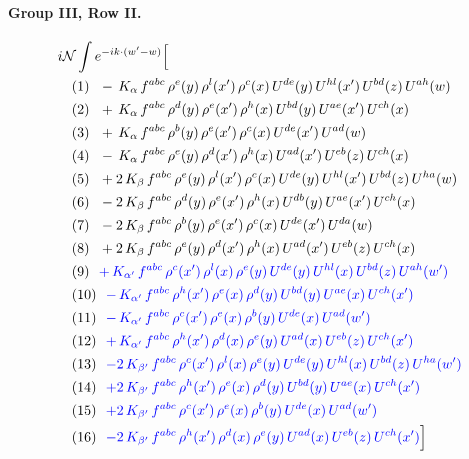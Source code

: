 \documentclass[10pt]{article}
\numberwithin{equation}{section}
\newcommand{\NN}{\mathcal N}
\begin{document}
\paragraph{Group III, Row II.}
\begin{align*}
&i\NN\int e^{-ik\cdot(w'-w)}\Big[\\
&\quad\text{(1)}\ \ -\,K_{\alpha}\,f^{abc}\,\rho^{e}(y)\,\rho^{l}(x')\,\rho^{c}(x)\,U^{de}(y)\,U^{hl}(x')\,U^{bd}(z)\,U^{ah}(w)\\
&\quad\text{(2)}\ \ +\,K_{\alpha}\,f^{abc}\,\rho^{d}(y)\,\rho^{e}(x')\,\rho^{h}(x)\,U^{bd}(y)\,U^{ae}(x')\,U^{ch}(x)\\
&\quad\text{(3)}\ \ +\,K_{\alpha}\,f^{abc}\,\rho^{b}(y)\,\rho^{e}(x')\,\rho^{c}(x)\,U^{de}(x')\,U^{ad}(w)\\
&\quad\text{(4)}\ \ -\,K_{\alpha}\,f^{abc}\,\rho^{e}(y)\,\rho^{d}(x')\,\rho^{h}(x)\,U^{ad}(x')\,U^{eb}(z)\,U^{ch}(x)\\
&\quad\text{(5)}\ \ +2\,K_{\beta}\,f^{abc}\,\rho^{e}(y)\,\rho^{l}(x')\,\rho^{c}(x)\,U^{de}(y)\,U^{hl}(x')\,U^{bd}(z)\,U^{ha}(w)\\
&\quad\text{(6)}\ \ -2\,K_{\beta}\,f^{abc}\,\rho^{d}(y)\,\rho^{e}(x')\,\rho^{h}(x)\,U^{db}(y)\,U^{ae}(x')\,U^{ch}(x)\\
&\quad\text{(7)}\ \ -2\,K_{\beta}\,f^{abc}\,\rho^{b}(y)\,\rho^{e}(x')\,\rho^{c}(x)\,U^{de}(x')\,U^{da}(w)\\
&\quad\text{(8)}\ \ +2\,K_{\beta}\,f^{abc}\,\rho^{e}(y)\,\rho^{d}(x')\,\rho^{h}(x)\,U^{ad}(x')\,U^{eb}(z)\,U^{ch}(x)\\
&\quad\text{(9)}\ \ \textcolor{blue}{+\,K_{\alpha'}\,f^{abc}\,\rho^{c}(x')\,\rho^{l}(x)\,\rho^{e}(y)\,U^{de}(y)\,U^{hl}(x)\,U^{bd}(z)\,U^{ah}(w')}\\
&\quad\text{(10)}\ \ \textcolor{blue}{-\,K_{\alpha'}\,f^{abc}\,\rho^{h}(x')\,\rho^{e}(x)\,\rho^{d}(y)\,U^{bd}(y)\,U^{ae}(x)\,U^{ch}(x')}\\
&\quad\text{(11)}\ \ \textcolor{blue}{-\,K_{\alpha'}\,f^{abc}\,\rho^{c}(x')\,\rho^{e}(x)\,\rho^{b}(y)\,U^{de}(x)\,U^{ad}(w')}\\
&\quad\text{(12)}\ \ \textcolor{blue}{+\,K_{\alpha'}\,f^{abc}\,\rho^{h}(x')\,\rho^{d}(x)\,\rho^{e}(y)\,U^{ad}(x)\,U^{eb}(z)\,U^{ch}(x')}\\
&\quad\text{(13)}\ \ \textcolor{blue}{-2\,K_{\beta'}\,f^{abc}\,\rho^{c}(x')\,\rho^{l}(x)\,\rho^{e}(y)\,U^{de}(y)\,U^{hl}(x)\,U^{bd}(z)\,U^{ha}(w')}\\
&\quad\text{(14)}\ \ \textcolor{blue}{+2\,K_{\beta'}\,f^{abc}\,\rho^{h}(x')\,\rho^{e}(x)\,\rho^{d}(y)\,U^{bd}(y)\,U^{ae}(x)\,U^{ch}(x')}\\
&\quad\text{(15)}\ \ \textcolor{blue}{+2\,K_{\beta'}\,f^{abc}\,\rho^{c}(x')\,\rho^{e}(x)\,\rho^{b}(y)\,U^{de}(x)\,U^{ad}(w')}\\
&\quad\text{(16)}\ \ \textcolor{blue}{-2\,K_{\beta'}\,f^{abc}\,\rho^{h}(x')\,\rho^{d}(x)\,\rho^{e}(y)\,U^{ad}(x)\,U^{eb}(z)\,U^{ch}(x')}\Big]
\end{align*}
\end{document}
